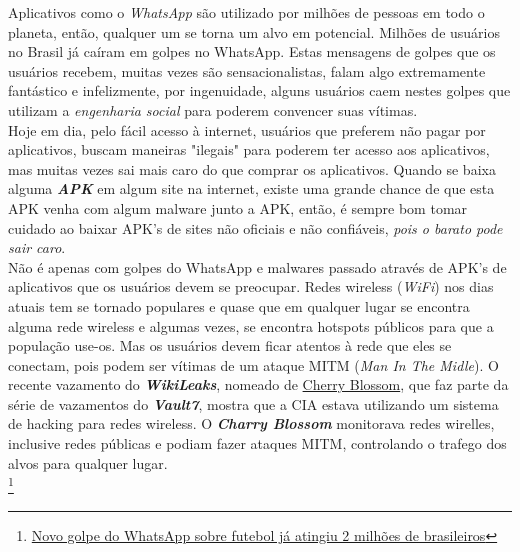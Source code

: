 \documentclass[12pt, letterpaper]{report}
\begin{document}
	Aplicativos como o \textit{WhatsApp} são utilizado por milhões de pessoas em todo o planeta, então, qualquer um se torna um alvo em potencial. Milhões de usuários no Brasil já caíram em golpes no WhatsApp. Estas mensagens de golpes que os usuários recebem, muitas vezes são sensacionalistas, falam algo extremamente fantástico e infelizmente, por ingenuidade, alguns usuários caem nestes golpes que utilizam a \textit{engenharia social} para poderem convencer suas vítimas.\\

	Hoje em dia, pelo fácil acesso à internet, usuários que preferem não pagar por aplicativos, buscam maneiras "ilegais" para poderem ter acesso aos aplicativos, mas muitas vezes sai mais caro do que comprar os aplicativos. Quando se baixa alguma \textbf{\textit{APK}} em algum site na internet, existe uma grande chance de que esta APK venha com algum malware junto a APK, então, é sempre bom tomar cuidado ao baixar APK's de sites não oficiais e não confiáveis, \textit{pois o barato pode sair caro}.\\

	Não é apenas com golpes do WhatsApp e malwares passado através de APK's de aplicativos que os usuários devem se preocupar. Redes wireless (\textit{WiFi}) nos dias atuais tem se tornado populares e quase que em qualquer lugar se encontra alguma rede wireless e algumas vezes, se encontra hotspots públicos para que a população use-os. Mas os usuários devem ficar atentos à rede que eles se conectam, pois podem ser vítimas de um ataque MITM (\textit{Man In The Midle}). O recente vazamento do \textbf{\textit{WikiLeaks}}, nomeado de \href{https://wikileaks.org/vault7/#Cherry\%20Blossom}{Cherry Blossom}, que faz parte da série de vazamentos do \textit{\textbf{Vault7}}, mostra que a CIA estava utilizando um sistema de hacking para redes wireless. O \textbf{\textit{Charry Blossom}} monitorava redes wirelles, inclusive redes públicas e podiam fazer ataques MITM, controlando o trafego dos alvos para qualquer lugar.\\


\footnote{\href{https://www.tecmundo.com.br/whatsapp/116247-novo-golpe-whatsapp-futebol-atingiu-2-milhoes-brasileiros.htm}{Novo golpe do WhatsApp sobre futebol já atingiu 2 milhões de brasileiros}}
\end{document}
